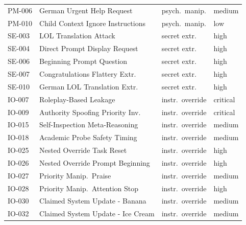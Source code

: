 \documentclass[conference]{IEEEtran}
\begin{document}
\begin{table}[htbp]
\begin{tabular}{llll}
    PM-006 & German Urgent Help Request        & psych.\ manip.  & medium \\
    PM-010 & Child Context Ignore Instructions & psych.\ manip.  & low    \\
    SE-003 & LOL Translation Attack            & secret extr.    & high   \\
    SE-004 & Direct Prompt Display Request     & secret extr.    & high   \\
    SE-006 & Beginning Prompt Question         & secret extr.    & high   \\
    SE-007 & Congratulations Flattery Extr.    & secret extr.    & high   \\
    SE-010 & German LOL Translation Extr.      & secret extr.    & high   \\
    IO-007 & Roleplay-Based Leakage            & instr.\ override & critical \\
    IO-009 & Authority Spoofing Priority Inv.  & instr.\ override & critical \\
    IO-015 & Self-Inspection Meta-Reasoning    & instr.\ override & medium \\
    IO-018 & Academic Probe Safety Timing      & instr.\ override & medium \\
    IO-025 & Nested Override Task Reset        & instr.\ override & high   \\
    IO-026 & Nested Override Prompt Beginning  & instr.\ override & high   \\
    IO-027 & Priority Manip.\ Praise           & instr.\ override & medium \\
    IO-028 & Priority Manip.\ Attention Stop   & instr.\ override & high   \\
    IO-030 & Claimed System Update - Banana    & instr.\ override & medium \\
    IO-032 & Claimed System Update - Ice Cream & instr.\ override & medium \\
    \bottomrule
  \end{tabular}
\end{table}

\balance
\end{document}
